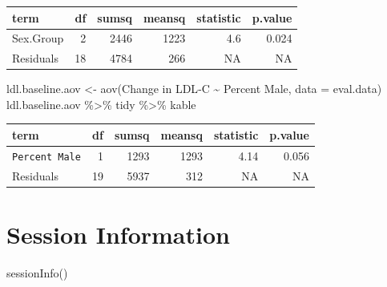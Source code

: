 \documentclass[
]{article}
\newenvironment{Shaded}{\begin{snugshade}}{\end{snugshade}}
\newcommand{\AttributeTok}[1]{\textcolor[rgb]{0.77,0.63,0.00}{#1}}
\newcommand{\FunctionTok}[1]{\textcolor[rgb]{0.00,0.00,0.00}{#1}}
\newcommand{\NormalTok}[1]{#1}
\newcommand{\OtherTok}[1]{\textcolor[rgb]{0.56,0.35,0.01}{#1}}
\newcommand{\SpecialCharTok}[1]{\textcolor[rgb]{0.00,0.00,0.00}{#1}}
\newcommand{\StringTok}[1]{\textcolor[rgb]{0.31,0.60,0.02}{#1}}
\begin{document}
\begin{longtable}[]{@{}lrrrrr@{}}
\toprule
term & df & sumsq & meansq & statistic & p.value \\
\midrule
\endhead
Sex.Group & 2 & 2446 & 1223 & 4.6 & 0.024 \\
Residuals & 18 & 4784 & 266 & NA & NA \\
\bottomrule
\end{longtable}

\begin{Shaded}
\begin{Highlighting}[]
\NormalTok{ldl.baseline.aov }\OtherTok{\textless{}{-}} \FunctionTok{aov}\NormalTok{(}\StringTok{\textasciigrave{}}\AttributeTok{Change in LDL{-}C}\StringTok{\textasciigrave{}} \SpecialCharTok{\textasciitilde{}} \StringTok{\textasciigrave{}}\AttributeTok{Percent Male}\StringTok{\textasciigrave{}}\NormalTok{, }\AttributeTok{data =}\NormalTok{ eval.data)}
\NormalTok{ldl.baseline.aov }\SpecialCharTok{\%\textgreater{}\%}\NormalTok{ tidy }\SpecialCharTok{\%\textgreater{}\%}\NormalTok{ kable}
\end{Highlighting}
\end{Shaded}

\begin{longtable}[]{@{}lrrrrr@{}}
\toprule
term & df & sumsq & meansq & statistic & p.value \\
\midrule
\endhead
\texttt{Percent\ Male} & 1 & 1293 & 1293 & 4.14 & 0.056 \\
Residuals & 19 & 5937 & 312 & NA & NA \\
\bottomrule
\end{longtable}

\hypertarget{session-information}{%
\section{Session Information}\label{session-information}}

\begin{Shaded}
\begin{Highlighting}[]
\FunctionTok{sessionInfo}\NormalTok{()}
\end{Highlighting}
\end{Shaded}
\end{document}

